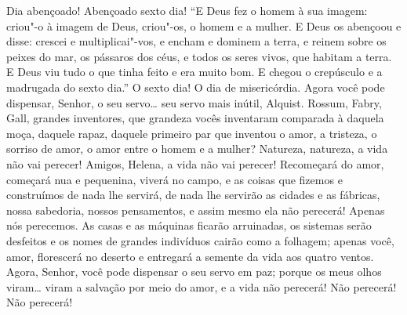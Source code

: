   Dia abençoado!  Abençoado sexto dia!  ``E Deus fez
o homem à sua imagem: criou"-o à imagem de Deus, criou"-os, o homem e a mulher. E
Deus os abençoou e disse: crescei e multiplicai"-vos, e encham e dominem a terra,
e reinem sobre os peixes do mar, os pássaros dos céus, e todos os seres vivos, que
habitam a terra.  E Deus viu tudo o que tinha feito e era
muito bom. E chegou o crepúsculo e a madrugada do sexto dia.''  O sexto dia! O dia de misericórdia. 
Agora você pode dispensar, Senhor, o seu servo\ldots{} seu servo mais inútil,
Alquist. Rossum, Fabry, Gall, grandes inventores, que grandeza vocês inventaram
comparada à daquela moça, daquele rapaz, daquele primeiro par que inventou o amor,
a tristeza, o sorriso de amor, o amor entre o homem e a mulher? Natureza, natureza,
a vida não vai perecer! Amigos, Helena, a vida não vai perecer! Recomeçará do
amor, começará nua e pequenina, viverá no campo, e as coisas que fizemos e
construímos de nada lhe servirá, de nada lhe servirão as cidades e as
fábricas, nossa sabedoria, nossos pensamentos, e assim mesmo ela não
perecerá! Apenas nós perecemos. As casas e as máquinas ficarão arruinadas, os sistemas
serão desfeitos e os nomes de grandes indivíduos cairão como a folhagem; apenas
você, amor, florescerá no deserto e entregará a semente da vida aos quatro ventos.
Agora, Senhor, você pode dispensar o seu servo em paz; porque os meus olhos
viram\ldots{} viram a salvação por meio do amor, e a vida não perecerá!
 Não perecerá!  Não perecerá!

